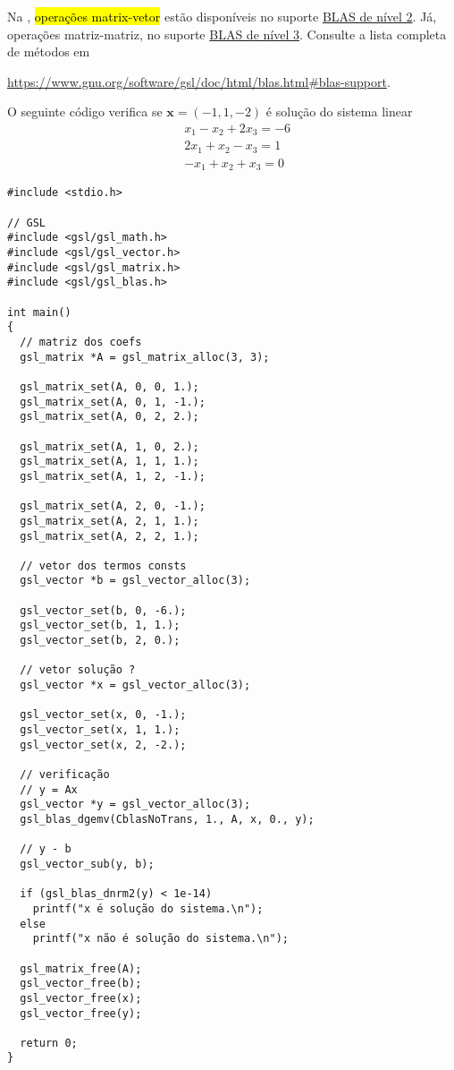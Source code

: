 \documentclass[12pt]{article}
\begin{document}
\begin{obs}
  Na {\gsl}, \hl{operações matrix-vetor} estão disponíveis no suporte \href{https://www.gnu.org/software/gsl/doc/html/blas.html\#level-2}{BLAS de nível 2}. Já, operações matriz-matriz, no suporte \href{https://www.gnu.org/software/gsl/doc/html/blas.html\#level-2}{BLAS de nível 3}. Consulte a lista completa de métodos em
  \begin{center}
    \url{https://www.gnu.org/software/gsl/doc/html/blas.html\#blas-support}.
  \end{center}
\end{obs}

\begin{ex}
  O seguinte código verifica se $\pmb{x} = (-1, 1, -2)$ é solução do sistema linear
  \begin{equation}
    \begin{aligned}
      &x_1 - x_2 + 2x_3 = -6\\
      &2x_1 + x_2 - x_3 = 1\\
      &-x_1 + x_2 + x_3 = 0
  \end{aligned}
\end{equation}

\begin{lstlisting}[caption=sisLin.cc]
#include <stdio.h>

// GSL
#include <gsl/gsl_math.h>
#include <gsl/gsl_vector.h>
#include <gsl/gsl_matrix.h>
#include <gsl/gsl_blas.h>

int main()
{
  // matriz dos coefs
  gsl_matrix *A = gsl_matrix_alloc(3, 3);
  
  gsl_matrix_set(A, 0, 0, 1.);
  gsl_matrix_set(A, 0, 1, -1.);
  gsl_matrix_set(A, 0, 2, 2.);

  gsl_matrix_set(A, 1, 0, 2.);
  gsl_matrix_set(A, 1, 1, 1.);
  gsl_matrix_set(A, 1, 2, -1.);

  gsl_matrix_set(A, 2, 0, -1.);
  gsl_matrix_set(A, 2, 1, 1.);
  gsl_matrix_set(A, 2, 2, 1.);

  // vetor dos termos consts
  gsl_vector *b = gsl_vector_alloc(3);

  gsl_vector_set(b, 0, -6.);
  gsl_vector_set(b, 1, 1.);
  gsl_vector_set(b, 2, 0.);

  // vetor solução ?
  gsl_vector *x = gsl_vector_alloc(3);

  gsl_vector_set(x, 0, -1.);
  gsl_vector_set(x, 1, 1.);
  gsl_vector_set(x, 2, -2.);

  // verificação
  // y = Ax
  gsl_vector *y = gsl_vector_alloc(3);
  gsl_blas_dgemv(CblasNoTrans, 1., A, x, 0., y);

  // y - b
  gsl_vector_sub(y, b);
  
  if (gsl_blas_dnrm2(y) < 1e-14)
    printf("x é solução do sistema.\n");
  else
    printf("x não é solução do sistema.\n");

  gsl_matrix_free(A);
  gsl_vector_free(b);
  gsl_vector_free(x);
  gsl_vector_free(y);
  
  return 0;
}
\end{lstlisting}
\end{ex}
\end{document}
